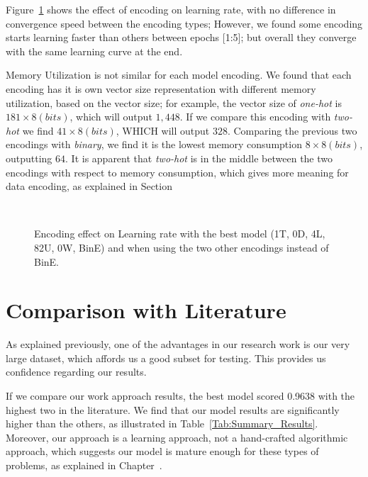 Figure~\ref{Fig:Convergence_Memory} shows the effect of encoding on learning rate, with no difference in convergence speed between the encoding types; However, we found some encoding starts learning faster than others between epochs [1:5]; but overall they converge with the same learning curve at the end.

Memory Utilization is not similar for each model encoding. We found that each encoding has it is own vector size representation with different memory utilization, based on the vector size; for example, the vector size of \textit{one-hot} is $181 \times 8(bits)$, which will output $1,448$. If we compare this encoding with \textit{two-hot} we find $41 \times 8(bits)$, WHICH will output $328$. Comparing the previous two encodings with \textit{binary}, we find it is the lowest memory consumption $8 \times 8(bits)$, outputting $64$. It is apparent that \textit{two-hot} is in the middle between the two encodings with respect to memory consumption, which gives more meaning for data encoding, as explained in Section~


\begin{figure}[!ht]
	\centering
	\begin{tikzpicture}
	
	\end{tikzpicture}
	\caption{Encoding effect on Learning rate with the best model (1T, 0D, 4L, 82U, 0W, BinE) and when using the two other encodings instead of BinE.}~\label{Fig:Convergence_Memory}%
\end{figure}



\section{Comparison with Literature}
As explained previously, one of the advantages in our research work is our very large dataset, which affords us a good subset for testing. This provides us confidence regarding our results.

If we compare our work approach results, the best model scored 0.9638 with the highest two in the literature. We find that our model results are significantly higher than the others, as illustrated in Table~\ref{Tab:Summary_Results}. Moreover, our approach is a learning approach, not a hand-crafted algorithmic approach, which suggests our model is mature enough for these types of problems, as explained in Chapter~.


